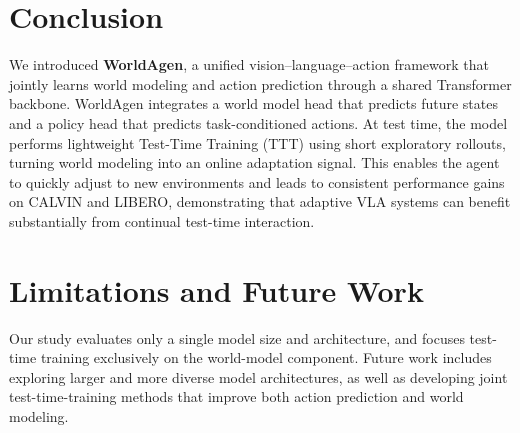 \section{Conclusion}

We introduced \textbf{WorldAgen}, a unified vision–language–action framework that jointly learns world modeling and action prediction through a shared Transformer backbone. WorldAgen integrates a world model head that predicts future states and a policy head that predicts task-conditioned actions. At test time, the model performs lightweight Test-Time Training (TTT) using short exploratory rollouts, turning world modeling into an online adaptation signal. This enables the agent to quickly adjust to new environments and leads to consistent performance gains on CALVIN and LIBERO, demonstrating that adaptive VLA systems can benefit substantially from continual test-time interaction.

\section{Limitations and Future Work}
Our study evaluates only a single model size and architecture, and focuses test-time training exclusively on the world-model component. Future work includes exploring larger and more diverse model architectures, as well as developing joint test-time-training methods that improve both action prediction and world modeling.